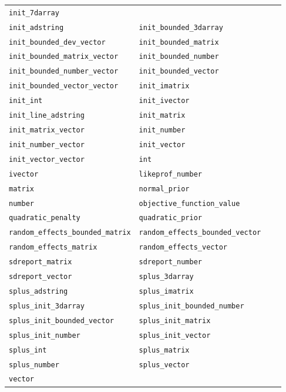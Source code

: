 \documentclass[a4paper,10pt,notumble]{leaflet}
\begin{document}
{\begin{center}
\begin{tabular}{@{}llll@{}}
\verb+init_7darray+\\
\verb+init_adstring+&
\verb+init_bounded_3darray+\\
\verb+init_bounded_dev_vector+&
\verb+init_bounded_matrix+\\
\verb+init_bounded_matrix_vector+&
\verb+init_bounded_number+\\
\verb+init_bounded_number_vector+&
\verb+init_bounded_vector+\\
\verb+init_bounded_vector_vector+&
\verb+init_imatrix+\\
\verb+init_int+&
\verb+init_ivector+\\
\verb+init_line_adstring+&
\verb+init_matrix+\\
\verb+init_matrix_vector+&
\verb+init_number+\\
\verb+init_number_vector+&
\verb+init_vector+\\
\verb+init_vector_vector+&
\verb+int+\\
\verb+ivector+&
\verb+likeprof_number+\\
\verb+matrix+&
\verb+normal_prior+\\
\verb+number+&
\verb+objective_function_value+\\
\verb+quadratic_penalty+&
\verb+quadratic_prior+\\
\verb+random_effects_bounded_matrix+&
\verb+random_effects_bounded_vector+\\
\verb+random_effects_matrix+&
\verb+random_effects_vector+\\
\verb+sdreport_matrix+&
\verb+sdreport_number+\\
\verb+sdreport_vector+&
\verb+splus_3darray+\\
\verb+splus_adstring+&
\verb+splus_imatrix+\\
\verb+splus_init_3darray+&
\verb+splus_init_bounded_number+\\
\verb+splus_init_bounded_vector+&
\verb+splus_init_matrix+\\
\verb+splus_init_number+&
\verb+splus_init_vector+\\
\verb+splus_int+&
\verb+splus_matrix+\\
\verb+splus_number+&
\verb+splus_vector+\\
\verb+vector+&
\\
\end{tabular}
\end{center}
}
\end{document}
